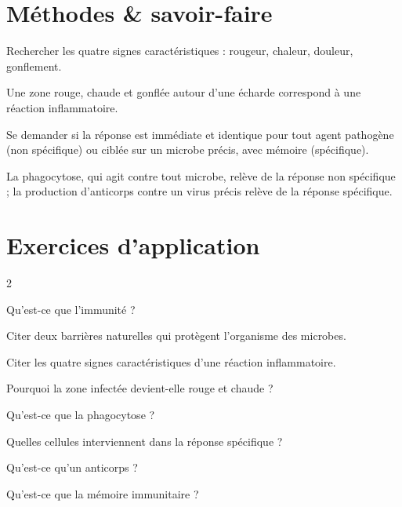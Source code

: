 \section{Méthodes \& savoir-faire}

Rechercher les quatre signes caractéristiques : rougeur, chaleur, douleur, gonflement.
\begin{exemple}
Une zone rouge, chaude et gonflée autour d'une écharde correspond à une réaction
inflammatoire.
\end{exemple}

Se demander si la réponse est immédiate et identique pour tout agent pathogène (non
spécifique) ou ciblée sur un microbe précis, avec mémoire (spécifique).
\begin{exemple}
La phagocytose, qui agit contre tout microbe, relève de la réponse non spécifique ; la
production d'anticorps contre un virus précis relève de la réponse spécifique.
\end{exemple}

\section{Exercices d'application}
\begin{multicols}{2}

\exo{} Qu'est-ce que l'immunité ?

\exo{} Citer deux barrières naturelles qui protègent l'organisme des microbes.

\exo{} Citer les quatre signes caractéristiques d'une réaction
inflammatoire.

\exo{} Pourquoi la zone infectée devient-elle rouge et chaude ?

\exo{} Qu'est-ce que la phagocytose ?

\exo{} Quelles cellules interviennent dans la réponse spécifique ?

\exo{} Qu'est-ce qu'un anticorps ?

\exo{} Qu'est-ce que la mémoire immunitaire ?

\end{multicols}

